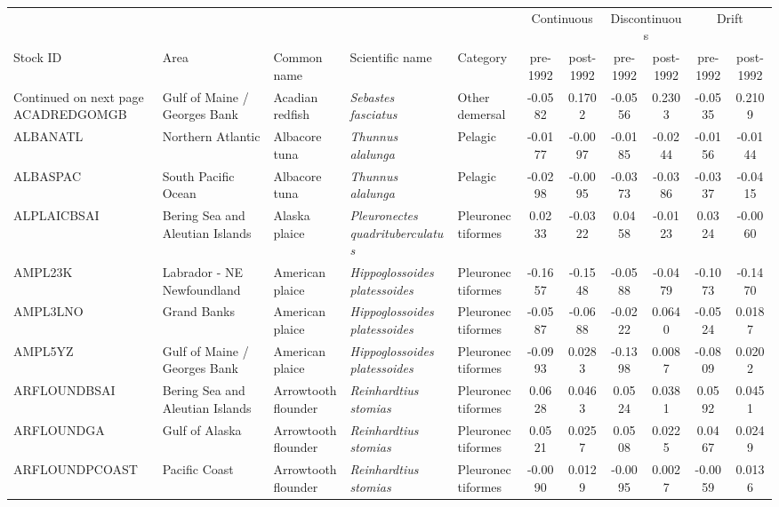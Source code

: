 \begin{longtable}{p{3cm}p{3cm}lllcccccc}
  \hline
  & & & & &\multicolumn{2}{c}{Continuous} & \multicolumn{2}{c}{Discontinuous} & \multicolumn{2}{c}{Drift}\\
  \cline{6-7}
  \cline{8-9}
  \cline{10-11}  
Stock ID & Area & Common name & Scientific name & Category & pre-1992 & post-1992 & pre-1992 & post-1992 & pre-1992 & post-1992 \\
\hline
\endhead
\hline Continued on next page
\endfoot
\hline 
\endlastfoot
ACADREDGOMGB & Gulf of Maine / Georges Bank & Acadian redfish & \textit{Sebastes fasciatus} & Other demersal & -0.0582 & 0.1702 & -0.0556 & 0.2303 & -0.0535 & 0.2109 \\
  ALBANATL & Northern Atlantic & Albacore tuna & \textit{Thunnus alalunga} & Pelagic & -0.0177 & -0.0097 & -0.0185 & -0.0244 & -0.0156 & -0.0144 \\
  ALBASPAC & South Pacific Ocean & Albacore tuna & \textit{Thunnus alalunga} & Pelagic & -0.0298 & -0.0095 & -0.0373 & -0.0386 & -0.0337 & -0.0415 \\
  ALPLAICBSAI & Bering Sea and Aleutian Islands & Alaska plaice & \textit{Pleuronectes quadrituberculatus} & Pleuronectiformes & 0.0233 & -0.0322 & 0.0458 & -0.0123 & 0.0324 & -0.0060 \\
  AMPL23K & Labrador - NE Newfoundland & American plaice & \textit{Hippoglossoides platessoides} & Pleuronectiformes & -0.1657 & -0.1548 & -0.0588 & -0.0479 & -0.1073 & -0.1470 \\
  AMPL3LNO & Grand Banks & American plaice & \textit{Hippoglossoides platessoides} & Pleuronectiformes & -0.0587 & -0.0688 & -0.0222 & 0.0640 & -0.0524 & 0.0187 \\
  AMPL5YZ & Gulf of Maine / Georges Bank & American plaice & \textit{Hippoglossoides platessoides} & Pleuronectiformes & -0.0993 & 0.0283 & -0.1398 & 0.0087 & -0.0809 & 0.0202 \\
  ARFLOUNDBSAI & Bering Sea and Aleutian Islands & Arrowtooth flounder & \textit{Reinhardtius stomias} & Pleuronectiformes & 0.0628 & 0.0463 & 0.0524 & 0.0381 & 0.0592 & 0.0451 \\
  ARFLOUNDGA & Gulf of Alaska & Arrowtooth flounder & \textit{Reinhardtius stomias} & Pleuronectiformes & 0.0521 & 0.0257 & 0.0508 & 0.0225 & 0.0467 & 0.0249 \\
  ARFLOUNDPCOAST & Pacific Coast & Arrowtooth flounder & \textit{Reinhardtius stomias} & Pleuronectiformes & -0.0090 & 0.0129 & -0.0095 & 0.0027 & -0.0059 & 0.0136 \\

\end{longtable}
